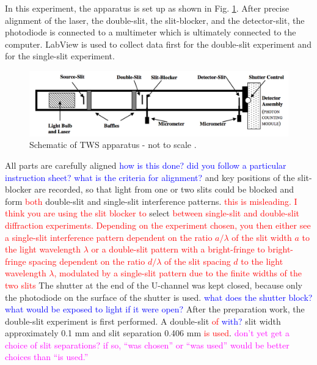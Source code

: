 \documentclass[prb,preprint]{revtex4-1}
\begin{document}
In this experiment, the apparatus is set up as shown in Fig. \ref{dia}. After precise alignment of the laser, the double-slit, the slit-blocker, and the detector-slit, the photodiode is connected to a multimeter which is ultimately connected to the computer. LabView is used to collect data first for the double-slit experiment and for the single-slit experiment. \\

\begin{figure}[h!]
\centering
\includegraphics[width=7in]{dia}
\caption{Schematic of TWS apparatus - not to scale \cite{dia}.}
\label{dia}
\end{figure}
All parts are carefully aligned \textcolor{blue}{how is this done? did you follow a particular instruction sheet? what is the criteria for alignment?} and key positions of the slit-blocker are recorded, so that light from one or two slits could be blocked and form \textcolor{red}{both} double-slit and single-slit interference patterns. \textcolor{red}{this is misleading. I think you are using the slit blocker to} select \textcolor{red}{between single-slit and double-slit diffraction experiments. Depending on the experiment chosen, you then either see a single-slit interference pattern dependent on the ratio $a/\lambda$ of the slit width $a$ to the light wavelength $\lambda$ or a double-slit pattern    with a bright-fringe to bright-fringe spacing dependent on the ratio $d/\lambda$ of the slit spacing $d$ to the light wavelength $\lambda$, modulated by a single-slit pattern due to the finite widths of the two slits } The shutter at the end of the U-channel was kept closed, because only the photodiode on the surface of the shutter is used. \textcolor{blue}{what does the shutter block? what would be exposed to light if it were open?} After the preparation work, the double-slit experiment is first performed. A double-slit \textcolor{red}{of} \textcolor{blue}{with?} slit width approximately 0.1 mm and slit separation 0.406 mm \textcolor{red}{is used}. \textcolor{magenta}{don't yet get a choice of slit separations? if so, ``was chosen'' or ``was used'' would be  better choices than ``is used.''}  \\
\end{document}
